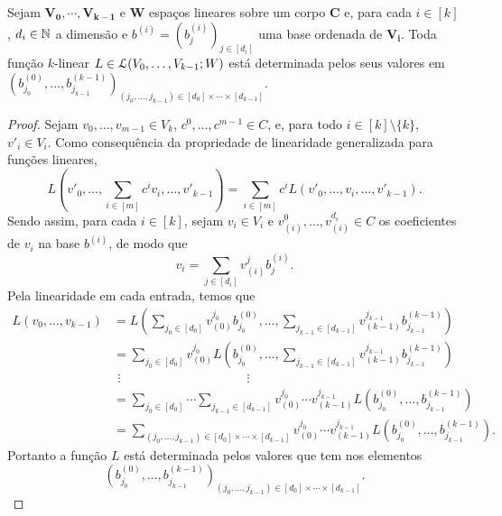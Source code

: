 \begin{proposition}
Sejam $\bm{V_0},\cdots,\bm{V_{k-1}}$ e $\bm W$ espaços lineares sobre um corpo $\bm C$ e, para cada $i \in [k]$, $d_i \in \mathbb{N}$ a dimensão e $b^{(i)}=(b^{(i)}_j)_{j \in [d_i]}$ uma base ordenada de $\bm{V_i}$. Toda função $k$-linear $L \in \mathcal{L}(V_0,\ldots,V_{k-1};W)$ está determinada pelos seus valores em $(b^{(0)}_{j_0},\ldots,b^{(k-1)}_{j_{k-1}})_{(j_0,\ldots,j_{k-1}) \in [d_0] \times \cdots \times [d_{k-1}]}$.
\end{proposition}
\begin{proof}
Sejam $v_0,\ldots,v_{m-1} \in V_k$, $c^0,\ldots,c^{m-1} \in C$, e, para todo $i \in [k]\setminus \{k\}$, $v'_i \in V_i$. Como consequência da propriedade de linearidade generalizada para funções lineares,
	\begin{equation*}
	L\left(v'_0,\ldots,\sum_{i \in [m]} c^i v_i,\ldots,v'_{k-1} \right) = \sum_{i \in [m]} c^i L\left(v'_0,\ldots,v_i,\ldots,v'_{k-1} \right).
	\end{equation*}
Sendo assim, para cada $i \in [k]$, sejam $v_i \in V_i$ e $v_{(i)}^0,\ldots,v_{(i)}^{d_i} \in C$ os coeficientes de $v_i$ na base $b^{(i)}$, de modo que
	\begin{equation*}
	v_i = \sum_{j \in [d_i]} v_{(i)}^j b^{(i)}_j.
	\end{equation*}
Pela linearidade em cada entrada, temos que
	\begin{align*}
	L(v_0,\ldots,v_{k-1}) &= L\left(\sum_{j_0 \in [d_0]} v_{(0)}^{j_0}b^{(0)}_{j_0},\ldots,\sum_{j_{k-1} \in [d_{k-1}]} v_{(k-1)}^{j_{k-1}} b^{(k-1)}_{j_{k-1}} \right) \\
		&= \sum_{j_0 \in [d_0]} v_{(0)}^{j_0} L\left(b^{(0)}_{j_0},\ldots,\sum_{j_{k-1} \in [d_{k-1}]} v_{(k-1)}^{j_{k-1}} b^{(k-1)}_{j_{k-1}} \right) \\
		&\ \, \vdots\qquad\qquad\qquad\qquad\qquad \vdots \\
		&= \sum_{j_0 \in [d_0]} \cdots \sum_{j_{k-1} \in [d_{k-1}]} v_{(0)}^{j_0} \cdots v_{(k-1)}^{j_{k-1}} L\left(b^{(0)}_{j_0},\ldots,b^{(k-1)}_{j_{k-1}} \right) \\
		&= \sum_{(j_0,\ldots,j_{k-1}) \in [d_0] \times \cdots \times [d_{k-1}]} v_{(0)}^{j_0} \cdots v_{(k-1)}^{j_{k-1}} L\left(b^{(0)}_{j_0},\ldots,b^{(k-1)}_{j_{k-1}} \right).
	\end{align*}
Portanto a função $L$ está determinada pelos valores que tem nos elementos
	\begin{equation*}
	(b^{(0)}_{j_0},\ldots,b^{(k-1)}_{j_{k-1}})_{(j_0,\ldots,j_{k-1}) \in [d_0] \times \cdots \times [d_{k-1}]}.
	\end{equation*}
\end{proof}

